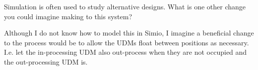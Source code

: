 \documentclass[answers]{exam}
\begin{document}
\begin{questions}
\question 
Simulation is often used to study alternative designs. What is one other change  you could imagine making to this system?
\begin{solution}
	Although I do not know how to model this in Simio, I imagine a beneficial change to the process would be to allow
	the UDMs float between positions as necessary. 
	I.e. let the in-processing UDM also out-process when they are not occupied and the out-processing UDM is.
\end{solution}

\end{questions}
\end{document}
